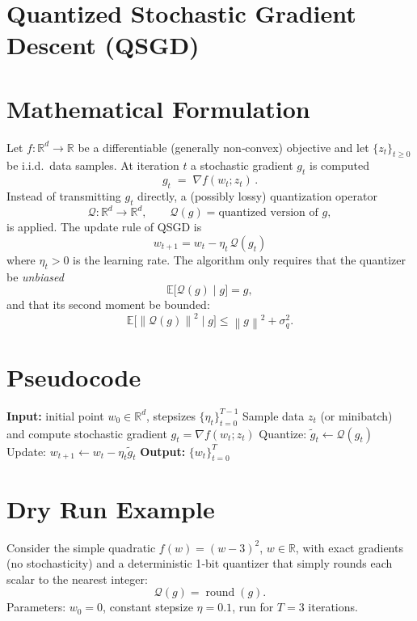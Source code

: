 \documentclass{article}
\newcommand{\E}{\mathbb{E}}
\newcommand{\R}{\mathbb{R}}
\newcommand{\norm}[1]{\left\lVert #1\right\rVert}
\newcommand{\Qop}{\mathcal{Q}}
\begin{document}
\section*{Quantized Stochastic Gradient Descent (QSGD)}

\section*{Mathematical Formulation}
Let $f:\R^{d}\to\R$ be a differentiable (generally non‑convex) objective and let $\{z_t\}_{t\ge 0}$ be i.i.d.\ data samples.
At iteration $t$ a stochastic gradient $g_t$ is computed
\[
g_t \;=\; \nabla f(w_t;z_t)\, .
\]
Instead of transmitting $g_t$ directly, a (possibly lossy) quantization operator
\[
\Qop:\R^{d}\to\R^{d},\qquad \Qop(g) = \text{quantized version of }g,
\]
is applied.  The update rule of QSGD is
\[
\boxed{\,w_{t+1}=w_t-\eta_t\,\Qop(g_t)\,}\tag{1}
\]
where $\eta_t>0$ is the learning rate.  The algorithm only requires that the quantizer be \emph{unbiased}
\[
\E\big[\Qop(g)\mid g\big]=g,\tag{2}
\]
and that its second moment be bounded:
\[
\E\big[\norm{\Qop(g)}^{2}\mid g\big]\le \norm{g}^{2}+\sigma_{q}^{2}.\tag{3}
\]

\section*{Pseudocode}
\begin{algorithm}[H]
\caption{Quantized Stochastic Gradient Descent (QSGD)}
\begin{algorithmic}[1]
\State \textbf{Input:} initial point $w_0\in\R^{d}$, stepsizes $\{\eta_t\}_{t=0}^{T-1}$
    \State Sample data $z_t$ (or minibatch) and compute stochastic gradient $g_t=\nabla f(w_t;z_t)$
    \State Quantize: $\tilde g_t\gets \Qop(g_t)$
    \State Update: $w_{t+1}\gets w_t-\eta_t\tilde g_t$
\EndFor
\State \textbf{Output:} $\{w_t\}_{t=0}^{T}$
\end{algorithmic}
\end{algorithm}

\section*{Dry Run Example}
Consider the simple quadratic $f(w)=(w-3)^{2}$, $w\in\R$, with exact gradients (no stochasticity) and a deterministic 1‑bit quantizer that simply rounds each scalar to the nearest integer:
\[
\Qop(g)=\operatorname{round}(g).
\]
Parameters: $w_0=0$, constant stepsize $\eta=0.1$, run for $T=3$ iterations.
\end{document}
